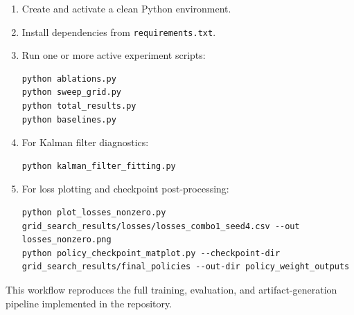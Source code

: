 \begin{enumerate}
    \item Create and activate a clean Python environment.
    \item Install dependencies from \texttt{requirements.txt}.
    \item Run one or more active experiment scripts:
    \begin{verbatim}
python ablations.py
python sweep_grid.py
python total_results.py
python baselines.py
\end{verbatim}
    \item For Kalman filter diagnostics:
    \begin{verbatim}
python kalman_filter_fitting.py
\end{verbatim}
    \item For loss plotting and checkpoint post-processing:
    \begin{verbatim}
python plot_losses_nonzero.py grid_search_results/losses/losses_combo1_seed4.csv --out losses_nonzero.png
python policy_checkpoint_matplot.py --checkpoint-dir grid_search_results/final_policies --out-dir policy_weight_outputs
\end{verbatim}
\end{enumerate}

This workflow reproduces the full training, evaluation, and artifact-generation
pipeline implemented in the repository.
